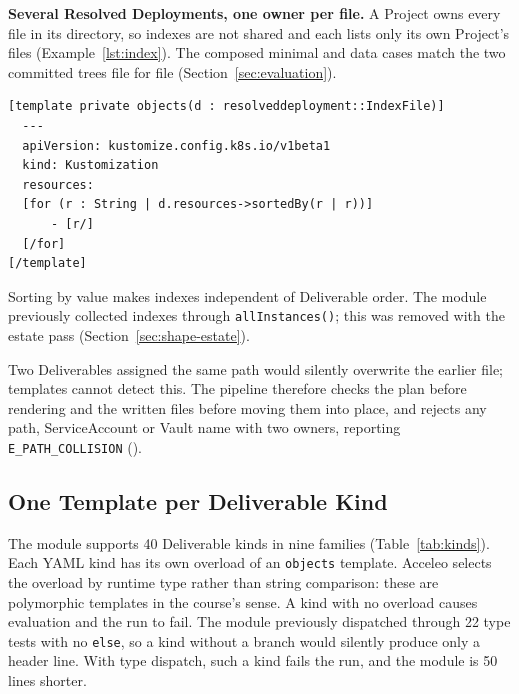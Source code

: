 \textbf{Several Resolved Deployments, one owner per file.} A Project owns every file in
its directory, so indexes are not shared and each lists only its own Project's
files (Example~\ref{lst:index}). The composed minimal and data cases match the
two committed trees file for file (Section~\ref{sec:evaluation}).

\begin{lstlisting}[style=report, language=acceleo, caption={An Index Lists Its Own Directory}, label={lst:index}]
[template private objects(d : resolveddeployment::IndexFile)]
  ---
  apiVersion: kustomize.config.k8s.io/v1beta1
  kind: Kustomization
  resources:
  [for (r : String | d.resources->sortedBy(r | r))]
      - [r/]
  [/for]
[/template]
\end{lstlisting}

Sorting by value makes indexes independent of Deliverable order. The module
previously collected indexes through \texttt{allInstances()}; this was removed with the
estate pass (Section~\ref{sec:shape-estate}).

Two Deliverables assigned the same path would silently overwrite the earlier file;
templates cannot detect this. The pipeline therefore checks the plan before rendering
and the written files before moving them into place, and rejects any path, ServiceAccount
or Vault name with two owners, reporting \texttt{E\_PATH\_COLLISION}
().

\subsection{One Template per Deliverable Kind}
\label{sec:m2t-kinds}

The module supports 40 Deliverable kinds in nine families
(Table~\ref{tab:kinds}). Each YAML kind has its own overload of an \texttt{objects} template. Acceleo selects the overload by runtime type
rather than string comparison: these are polymorphic templates in the course's sense.
A kind with no overload causes evaluation and the run to fail. The module previously
dispatched through 22 type tests with no \texttt{else}, so a kind without a branch
would silently produce only a header line. With type dispatch, such a kind fails the run, and the module is 50 lines shorter.

